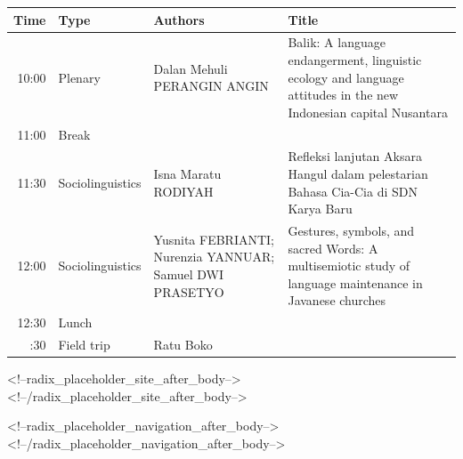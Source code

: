 \documentclass[
  11pt,
]{article}
\begin{document}
\begin{longtable}{rp{4.3cm}p{4.3cm}p{4.3cm}}
\toprule
Time & Type & Authors & Title\\
\midrule
10:00 & Plenary & Dalan Mehuli PERANGIN ANGIN & Balik: A language endangerment, linguistic ecology and language attitudes in the new Indonesian capital Nusantara\\
11:00 & Break &  & \\
11:30 & Sociolinguistics & Isna Maratu RODIYAH & Refleksi lanjutan Aksara Hangul dalam pelestarian Bahasa Cia-Cia di SDN Karya Baru\\
12:00 & Sociolinguistics & Yusnita FEBRIANTI; Nurenzia YANNUAR; Samuel DWI PRASETYO & Gestures, symbols, and sacred Words: A multisemiotic study of language maintenance in Javanese churches\\
12:30 & Lunch &  & \\
\addlinespace
13:30 & Field trip & Ratu Boko & \\
\bottomrule
\end{longtable}

\thispagestyle{empty}

<!--radix_placeholder_site_after_body-->
<!--/radix_placeholder_site_after_body-->

<!--radix_placeholder_navigation_after_body-->
<!--/radix_placeholder_navigation_after_body-->
\end{document}
